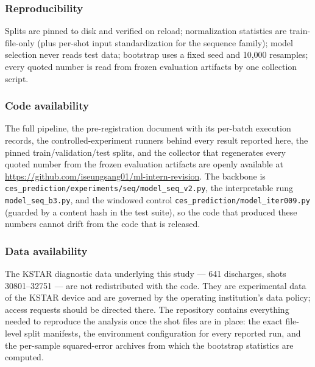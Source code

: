\documentclass[10pt]{article}
\begin{document}
\subsubsection*{Reproducibility}
Splits are pinned to disk and verified on reload; normalization statistics are
train-file-only (plus per-shot input standardization for the sequence family);
model selection never reads test data; bootstrap uses a fixed seed and 10{,}000
resamples; every quoted number is read from frozen evaluation artifacts by one
collection script.

\subsubsection*{Code availability}
The full pipeline, the pre-registration document with its per-batch execution
records, the controlled-experiment runners behind every result reported here, the
pinned train/validation/test splits, and the collector that regenerates every
quoted number from the frozen evaluation artifacts are openly available at
\url{https://github.com/iseungsang01/ml-intern-revision}. The backbone is
\texttt{ces\_prediction/experiments/seq/model\_seq\_v2.py}, the interpretable rung
\texttt{model\_seq\_b3.py}, and the windowed control
\texttt{ces\_prediction/model\_iter009.py} (guarded by a content hash in the test
suite), so the code that produced these numbers cannot drift from the code that is
released.

\subsubsection*{Data availability}
The KSTAR diagnostic data underlying this study --- 641 discharges, shots
30801--32751 --- are not redistributed with the code. They are experimental data of
the KSTAR device and are governed by the operating institution's data policy;
access requests should be directed there. The repository contains everything needed
to reproduce the analysis once the shot files are in place: the exact file-level
split manifests, the environment configuration for every reported run, and the
per-sample squared-error archives from which the bootstrap statistics are computed.



\end{document}
